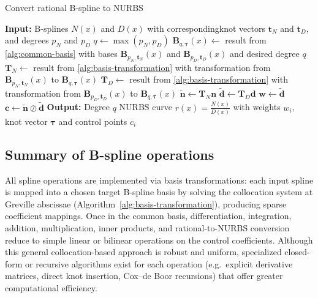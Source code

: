 \begin{algorithm}
    \caption{Convert rational B-spline to NURBS}\label{alg:nurbs-conversion}
    \begin{algorithmic}[1]
        \State \textbf{Input:} B-splines $N(x)$ and $D(x)$ with correspondingknot vectors $\mathbf t_N$ and $\mathbf t_D$, and degrees $p_N$ and $p_D$
        \State $q \gets \max(p_N, p_D)$
        \State $\mathbf B_{q,\boldsymbol{\tau}}(x) \gets $ result from \cref{alg:common-basis} with bases $\mathbf B_{p_N,\mathbf t_N}(x)$ and $\mathbf B_{p_D,\mathbf t_D}(x)$ and desired degree $q$
        \State $\mathbf T_N \gets $ result from \cref{alg:basis-transformation} with transformation from $\mathbf B_{p_N,\mathbf t_N}(x)$ to $\mathbf B_{q,\boldsymbol{\tau}}(x)$
        \State $\mathbf T_D \gets $ result from \cref{alg:basis-transformation} with transformation from $\mathbf B_{p_D,\mathbf t_D}(x)$ to $\mathbf B_{q,\boldsymbol{\tau}}(x)$
        \State $\mathbf{\tilde n} \gets \mathbf T_N \mathbf n$
        \State $\mathbf{\tilde d} \gets \mathbf T_D \mathbf d$
        \State $\mathbf w \gets \mathbf{\tilde d}$
        \State $\mathbf c \gets \mathbf{\tilde n} \oslash \mathbf{\tilde d}$ 
        \State \textbf{Output:} Degree $q$ NURBS curve $\displaystyle r(x) = \frac{N(x)}{D(x)}$ with weights $w_i$, knot vector $\boldsymbol{\tau}$ and control points $c_i$
    \end{algorithmic}
\end{algorithm}


\subsection{Summary of B-spline operations}\label{sec:summary-b-spline-operations}
All spline operations are implemented via basis transformations: each input spline is mapped into a chosen target B-spline basis by solving the collocation system at Greville abscissae (Algorithm~\ref{alg:basis-transformation}), producing sparse coefficient mappings. Once in the common basis, differentiation, integration, addition, multiplication, inner products, and rational-to-NURBS conversion reduce to simple linear or bilinear operations on the control coefficients. Although this general collocation-based approach is robust and uniform, specialized closed-form or recursive algorithms exist for each operation (e.g.\ explicit derivative matrices, direct knot insertion, Cox–de Boor recursions) that offer greater computational efficiency.


